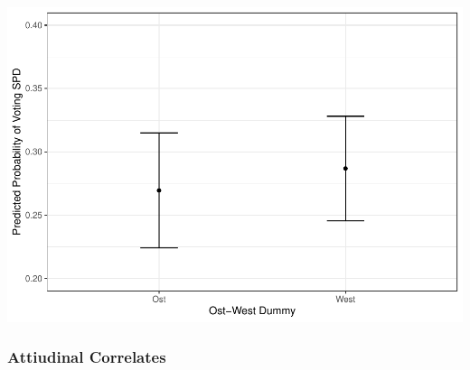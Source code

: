 \documentclass[
]{article}
\begin{document}
\includegraphics{AVCD_Final_Assignment-Edenhofer_files/figure-latex/spd-ost-west-1.pdf}

\hypertarget{attiudinal-correlates}{%
\subsubsection{Attiudinal Correlates}\label{attiudinal-correlates}}
\end{document}
